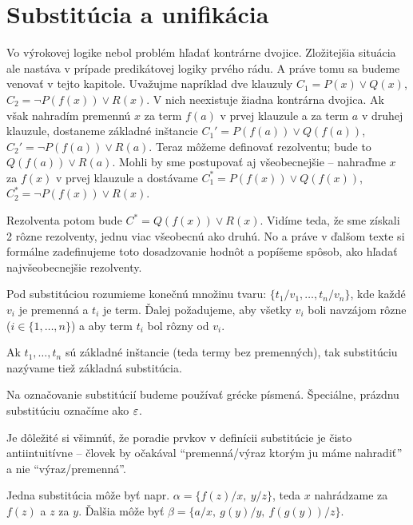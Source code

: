 \section{Substitúcia a unifikácia}

Vo výrokovej logike nebol problém hľadať kontrárne dvojice.
Zložitejšia situácia ale nastáva v prípade predikátovej logiky
prvého rádu. A práve tomu sa budeme venovať v tejto kapitole.
Uvažujme napríklad dve klauzuly
$C_1=P(x) \lor Q(x)$, $C_2 = \neg P(f(x)) \lor R(x)$.
V nich neexistuje žiadna kontrárna dvojica. Ak však nahradím premennú
$x$ za term $f(a)$ v prvej klauzule a za term $a$ v druhej klauzule,
dostaneme základné inštancie
$C_1'=P(f(a)) \lor Q(f(a))$, $C_2'=\neg P(f(a)) \lor R(a)$.
Teraz môžeme definovať rezolventu; bude to $Q(f(a)) \lor R(a)$.
Mohli by sme postupovať aj všeobecnejšie -- nahraďme $x$ za $f(x)$ v
prvej klauzule a dostávame
$ C_1^*= P(f(x)) \lor Q(f(x))$, $C_2^*= \neg P(f(x)) \lor R(x)$.

Rezolventa potom bude $C^*= Q(f(x)) \lor R(x)$.
Vidíme teda, že sme získali 2 rôzne rezolventy, jednu viac všeobecnú
ako druhú. No a práve v ďalšom texte si formálne zadefinujeme toto
dosadzovanie hodnôt a popíšeme spôsob, ako hľadať najvšeobecnejšie
rezolventy.

\begin{definicia}[Substitúcia]
    Pod substitúciou rozumieme konečnú množinu tvaru:
    $\{t_1/v_1, \ldots, t_n/v_n\}$, kde každé $v_i$ je premenná a
    $t_i$ je term.
    Ďalej požadujeme, aby všetky
    $v_i$ boli navzájom rôzne ($i \in\{1,\dots,n\}$)
    a aby term $t_i$ bol rôzny od $v_i$.

    Ak $t_1, \ldots, t_n$ sú základné inštancie (teda termy bez premenných),
    tak substitúciu nazývame tiež základná substitúcia.
\end{definicia}

\begin{poznamka}
    Na označovanie substitúcií budeme používať grécke písmená.
    Špeciálne, prázdnu substitúciu označíme ako $\varepsilon$.
\end{poznamka}

\begin{poznamka}
    Je dôležité si všimnúť, že poradie prvkov v definícii substitúcie je
    čisto antiintuitívne -- človek by očakával ``premenná/výraz ktorým ju
    máme nahradiť'' a nie ``výraz/premenná''.
\end{poznamka}

\begin{priklad}
    Jedna substitúcia môže byť napr.
    $\alpha = \{ f(z)/x,\ y/z\}$, teda $x$ nahrádzame za $f(z)$ a
    $z$ za $y$.
    Ďalšia môže byť $\beta = \{ a/x,\ g(y)/y,\ f(g(y))/z\}$.
\end{priklad}

